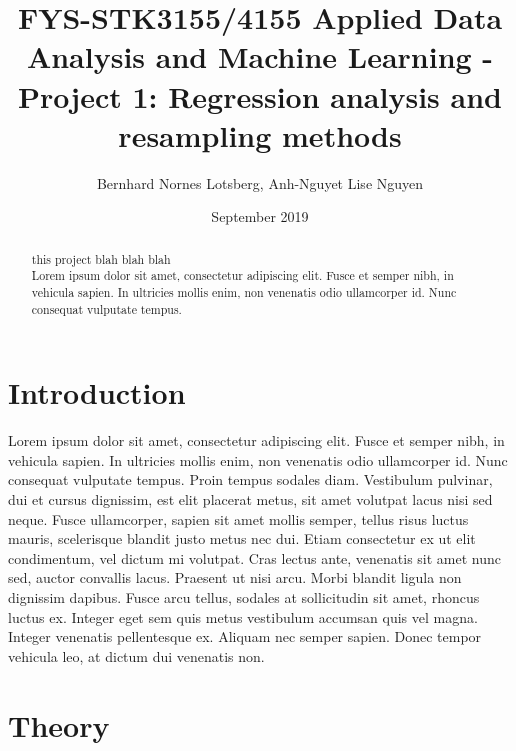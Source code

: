 \documentclass[a4paper, 10pt]{article}
\title{FYS-STK3155/4155 Applied Data Analysis and Machine Learning - Project 1: Regression analysis and resampling methods }
\author{Bernhard Nornes Lotsberg, Anh-Nguyet Lise Nguyen}
\date{September 2019}
\begin{document}
\maketitle


\begin{abstract} %
    this project blah blah blah\\
    Lorem ipsum dolor sit amet, consectetur adipiscing elit. Fusce et semper nibh, in vehicula sapien. In ultricies mollis enim, non venenatis odio ullamcorper id. Nunc consequat vulputate tempus.
\end{abstract}

\begin{multicols}{2}
\section{Introduction}



Lorem ipsum dolor sit amet, consectetur adipiscing elit. Fusce et semper nibh, in vehicula sapien. In ultricies mollis enim, non venenatis     odio ullamcorper id. Nunc consequat vulputate tempus. Proin tempus sodales diam. Vestibulum pulvinar, dui et cursus dignissim, est elit placerat metus, sit amet volutpat lacus nisi sed neque. Fusce ullamcorper, sapien sit amet mollis semper, tellus risus luctus mauris, scelerisque blandit justo metus nec dui. Etiam consectetur ex ut elit condimentum, vel dictum mi volutpat. Cras lectus ante, venenatis sit amet nunc sed, auctor convallis lacus. Praesent ut nisi arcu. Morbi blandit ligula non dignissim dapibus. Fusce arcu tellus, sodales at sollicitudin sit amet, rhoncus luctus ex. Integer eget sem quis metus vestibulum accumsan quis vel magna. Integer venenatis pellentesque ex. Aliquam nec semper sapien. Donec tempor vehicula leo, at dictum dui venenatis non.


\section{Theory}

\end{multicols}
\end{document}
